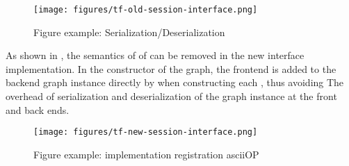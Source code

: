\begin{content}
\begin{figure}[H]
\centering
\texttt{[image: figures/tf-old-session-interface.png]}
\caption{Figure example: Serialization/Deserialization}
 \label{fig:tf-old-session-interface}
\end{figure}

As shown in , the semantics of  of  can be removed in the new interface implementation. In the constructor of the graph, the frontend  is added to the backend  graph instance directly by  when constructing each , thus avoiding The overhead of serialization and deserialization of the graph instance at the front and back ends.

\begin{figure}[H]
\centering
\texttt{[image: figures/tf-new-session-interface.png]}
\caption{Figure example: implementation registration ascii{OP}}
 \label{fig:tf-new-session-interface}
\end{figure}

\end{content}